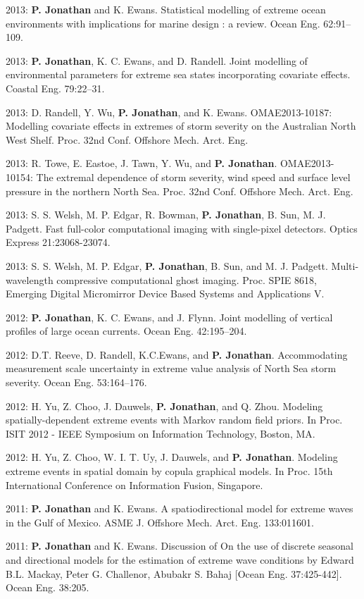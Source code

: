 \documentclass[11pt,a4paper]{moderncv}
\begin{document}
2013: \textbf{P. Jonathan} and K. Ewans. Statistical modelling of extreme ocean environments with implications for marine design : a review. Ocean Eng. 62:91--109.

2013: \textbf{P. Jonathan}, K. C. Ewans, and D. Randell. Joint modelling of environmental parameters for extreme sea states incorporating covariate effects. Coastal Eng. 79:22--31.

2013: D. Randell, Y. Wu, \textbf{P. Jonathan}, and K. Ewans. OMAE2013-10187: Modelling covariate effects in extremes of storm severity on the Australian North West Shelf. Proc. 32nd Conf. Offshore Mech. Arct. Eng.

2013: R. Towe, E. Eastoe, J. Tawn, Y. Wu, and \textbf{P. Jonathan}. OMAE2013-10154: The extremal dependence of storm severity, wind speed and surface level pressure in the northern North Sea. Proc. 32nd Conf. Offshore Mech. Arct. Eng.

2013: S. S. Welsh, M. P. Edgar, R. Bowman, \textbf{P. Jonathan}, B. Sun, M. J. Padgett. Fast full-color computational imaging with single-pixel detectors. Optics Express 21:23068-23074.

2013: S. S. Welsh, M. P. Edgar, \textbf{P. Jonathan}, B. Sun, and M. J. Padgett. Multi-wavelength compressive computational ghost imaging. Proc. SPIE 8618, Emerging Digital Micromirror Device Based Systems and Applications V.

2012: \textbf{P. Jonathan}, K. C. Ewans, and J. Flynn. Joint modelling of vertical profiles of large ocean currents. Ocean Eng. 42:195--204.

2012: D.T. Reeve, D. Randell, K.C.Ewans, and \textbf{P. Jonathan}. Accommodating measurement scale uncertainty in extreme value analysis of North Sea storm severity. Ocean Eng. 53:164--176.

2012: H. Yu, Z. Choo, J. Dauwels, \textbf{P. Jonathan}, and Q. Zhou. Modeling spatially-dependent extreme events with Markov random field priors. In Proc. ISIT 2012 - IEEE Symposium on Information Technology, Boston, MA.

2012: H. Yu, Z. Choo, W. I. T. Uy, J. Dauwels, and \textbf{P. Jonathan}. Modeling extreme events in spatial domain by copula graphical models. In Proc. 15th International Conference on Information Fusion, Singapore.

2011: \textbf{P. Jonathan} and K. Ewans. A spatiodirectional model for extreme waves in the Gulf of Mexico. ASME J. Offshore Mech. Arct. Eng. 133:011601.

2011: \textbf{P. Jonathan} and K. Ewans. Discussion of On the use of discrete seasonal and directional models for the estimation of extreme wave conditions by Edward B.L. Mackay, Peter G. Challenor, Abubakr S. Bahaj [Ocean Eng. 37:425-442]. Ocean Eng. 38:205.
\end{document}
